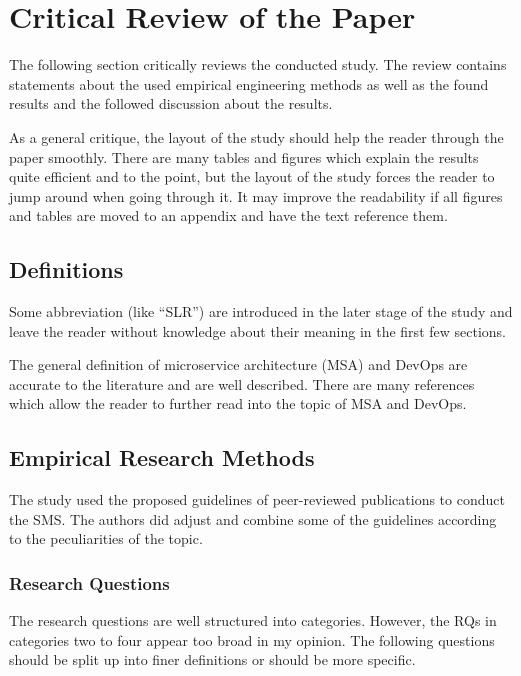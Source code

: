 \section{Critical Review of the Paper}
\label{sec:review}

The following section critically reviews the conducted study.
The review contains statements about the used empirical engineering methods
as well as the found results and the followed discussion about the results.

As a general critique, the layout of the study should help
the reader through the paper smoothly.
There are many tables and figures which explain the results
quite efficient and to the point, but the layout of the study forces the
reader to jump around when going through it. It may improve the readability
if all figures and tables are moved to an appendix
and have the text reference them.

\subsection{Definitions}

Some abbreviation (like ``SLR'') are introduced in the later stage of
the study and leave the reader without knowledge about their meaning
in the first few sections.

The general definition of microservice architecture (MSA) and DevOps
are accurate to the literature and are well described. There are
many references which allow the reader to further read into the topic
of MSA and DevOps.

\subsection{Empirical Research Methods}

The study used the proposed guidelines of peer-reviewed publications
to conduct the SMS. The authors did adjust and combine some of the guidelines
according to the peculiarities of the topic.

\subsubsection{Research Questions}

The research questions are well structured into categories.
However, the RQs in categories two to four appear too broad
in my opinion. The following questions should be split up into finer definitions or
should be more specific.

